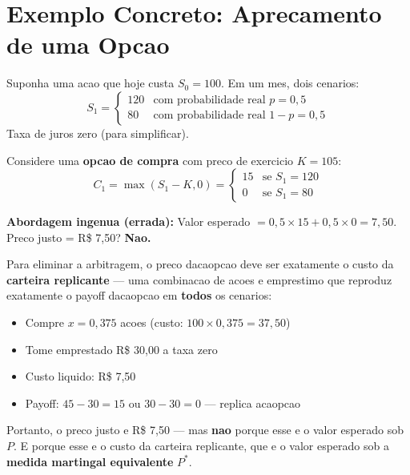 \section{Exemplo Concreto: Aprecamento de uma Opcao}

Suponha uma acao que hoje custa $S_0 = 100$. Em um mes, dois cenarios:
\[
S_1 = \begin{cases}
120 & \text{com probabilidade real } p = 0,5 \\
80  & \text{com probabilidade real } 1-p = 0,5
\end{cases}
\]
Taxa de juros zero (para simplificar).

Considere uma \textbf{opcao de compra} com preco de exercicio $K = 105$:
\[
C_1 = \max(S_1 - K, 0) = \begin{cases} 15 & \text{se } S_1 = 120 \\
0 & \text{se } S_1 = 80 \end{cases}
\]

\textbf{Abordagem ingenua (errada):} Valor esperado $= 0,5 \times 15 +
0,5 \times 0 = 7,50$. Preco justo = R\$ 7,50? \textbf{Nao.}

Para eliminar a arbitragem, o preco dacaopcao deve ser exatamente o custo
da \textbf{carteira replicante} --- uma combinacao de acoes e emprestimo que
reproduz exatamente o payoff dacaopcao em \textbf{todos} os cenarios:

\begin{itemize}[nosep]
  \item Compre $x = 0,375$ acoes (custo: $100 \times 0,375 = 37,50$)
  \item Tome emprestado R\$ 30,00 a taxa zero
  \item Custo liquido: R\$ 7,50
  \item Payoff: $45 - 30 = 15$ ou $30 - 30 = 0$ --- replica acaopcao
\end{itemize}

Portanto, o preco justo e R\$ 7,50 --- mas \textbf{nao} porque esse e o valor
esperado sob $P$. E porque esse e o custo da carteira replicante, que e o
valor esperado sob a \textbf{medida martingal equivalente} $P^*$.

